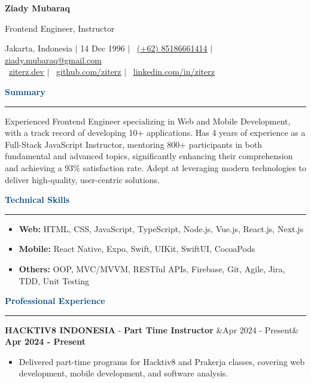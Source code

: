 \documentclass{article}
\newcommand{\header}[1]{
	\vspace{2mm}
	{\large \noindent \textcolor[HTML]{004780}{\textbf{#1}}}
	\vspace{0.5mm}
	\hrule
	\vspace{1.5mm}
}
\newcommand{\skillsheader}[1]{
	\vspace{2mm}
	{\large \noindent \textcolor[HTML]{004780}{\textbf{#1}}}
	\vspace{1.5mm}
	\hrule
	\vspace{1.5mm}
}
\newcommand{\longitem}[4]{
	\begin{adjustwidth}{}{}
		\MakeUppercase{\textbf{#1}} - \textbf{#3} \hfill \ifx&#2& \else \textbf{#2} \fi \\
	\end{adjustwidth}
	\vspace{-1mm}
}
\newcommand{\skills}[1]{%
	\begin{itemize}[leftmargin=*]\leftskip=0.5em
		\setlength\itemsep{-1mm}
		\vspace{-1mm}
		#1
	\end{itemize}%
}
\newcommand{\liststart}{\begin{itemize}[leftmargin=*]\leftskip=0.5em\vspace{-5mm}}
\newcommand{\listend}{\end{itemize}\vspace{0.2mm}}
\begin{document}
	\begin{flushleft}
		{\LARGE \textbf{Ziady Mubaraq}} \\

		\vspace{1mm}

		{\large Frontend Engineer, Instructor}

		\vspace{1mm}
		
		Jakarta, Indonesia  $\mid$ 14 Dec 1996 $\mid$ \faWhatsapp ~\href{https://wa.me/6285186661414}{\underline{(+62) 85186661414}} $\mid$ \faEnvelope[regular] \href{mailto:ziady.mubaraq@gmail.com}{\underline{ziady.mubaraq@gmail.com}} \\
		\faLink ~\href{https://ziterz.dev}{\underline{ziterz.dev}}  $\mid$ \faGithub ~\href{https://github.com/ziterz}{\underline{github.com/ziterz}} $\mid$ \faLinkedin ~\href{https://linkedin.com/in/ziterz}{\underline{linkedin.com/in/ziterz}}
	\end{flushleft}

	\vspace{-1mm}

	\header{Summary}
		Experienced Frontend Engineer specializing in Web and Mobile Development, with a track record of developing 10+ applications. Has 4 years of experience as a Full-Stack JavaScript Instructor, mentoring 800+ participants in both fundamental and advanced topics, significantly enhancing their comprehension and achieving a 93\% satisfaction rate. Adept at leveraging modern technologies to deliver high-quality, user-centric solutions.

	\vspace{1mm}

	\skillsheader{Technical Skills}
	\skills{
		\item \textbf{Web:} HTML, CSS, JavaScript, TypeScript, Node.js, Vue.js, React.js, Next.js
		\item \textbf{Mobile:} React Native, Expo, Swift, UIKit, SwiftUI, CocoaPods
		\item \textbf{Others:} OOP, MVC/MVVM, RESTful APIs, Firebase, Git, Agile, Jira, TDD, Unit Testing
	}		

	\header{Professional Experience}
		\longitem{Hacktiv8 Indonesia}{Apr 2024 - Present}{Part Time Instructor}{}
		\liststart
			\item Delivered part-time programs for Hacktiv8 and Prakerja classes, covering web development, mobile development, and software analysis.
		\listend
\end{document}
